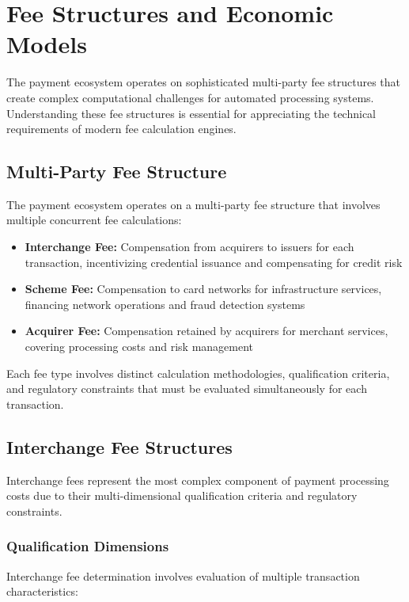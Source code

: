 \section{Fee Structures and Economic Models}

The payment ecosystem operates on sophisticated multi-party fee structures that create complex computational challenges for automated processing systems. Understanding these fee structures is essential for appreciating the technical requirements of modern fee calculation engines.

\subsection{Multi-Party Fee Structure}

The payment ecosystem operates on a multi-party fee structure that involves multiple concurrent fee calculations:

\begin{itemize}
   \item \textbf{Interchange Fee:} Compensation from acquirers to issuers for each transaction, incentivizing credential issuance and compensating for credit risk
   \item \textbf{Scheme Fee:} Compensation to card networks for infrastructure services, financing network operations and fraud detection systems
   \item \textbf{Acquirer Fee:} Compensation retained by acquirers for merchant services, covering processing costs and risk management
\end{itemize}

Each fee type involves distinct calculation methodologies, qualification criteria, and regulatory constraints that must be evaluated simultaneously for each transaction.

\subsection{Interchange Fee Structures}

Interchange fees represent the most complex component of payment processing costs due to their multi-dimensional qualification criteria and regulatory constraints.

\subsubsection{Qualification Dimensions}

Interchange fee determination involves evaluation of multiple transaction characteristics:

